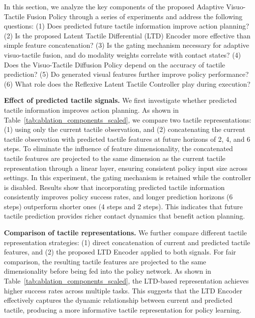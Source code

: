 In this section, we analyze the key components of the proposed Adaptive Visuo-Tactile Fusion Policy through a series of experiments and address the following questions:
(1) Does predicted future tactile information improve action planning?
(2) Is the proposed Latent Tactile Differential (LTD) Encoder more effective than simple feature concatenation?
(3) Is the gating mechanism necessary for adaptive visuo-tactile fusion, and do modality weights correlate with contact states?
(4) Does the Visuo-Tactile Diffusion Policy depend on the accuracy of tactile prediction?
(5) Do generated visual features further improve policy performance?
(6) What role does the Reflexive Latent Tactile Controller play during execution?

\noindent \textbf{Effect of predicted tactile signals.}
We first investigate whether predicted tactile information improves action planning. As shown in Table~\ref{tab:ablation_components_scaled}, we compare two tactile representations:
(1) using only the current tactile observation, and
(2) concatenating the current tactile observation with predicted tactile features at future horizons of 2, 4, and 6 steps.
To eliminate the influence of feature dimensionality, the concatenated tactile features are projected to the same dimension as the current tactile representation through a linear layer, ensuring consistent policy input size across settings. 
In this experiment, the gating mechanism is retained while the controller is disabled.
Results show that incorporating predicted tactile information consistently improves policy success rates, and longer prediction horizons (6 steps) outperform shorter ones (4 steps and 2 steps). This indicates that future tactile prediction provides richer contact dynamics that benefit action planning.




\noindent \textbf{Comparison of tactile representations.}
We further compare different tactile representation strategies:
(1) direct concatenation of current and predicted tactile features, and
(2) the proposed LTD Encoder applied to both signals.
For fair comparison, the resulting tactile features are projected to the same dimensionality before being fed into the policy network.
As shown in Table~\ref{tab:ablation_components_scaled}, the LTD-based representation achieves higher success rates across multiple tasks. This suggests that the LTD Encoder effectively captures the dynamic relationship between current and predicted tactile, producing a more informative tactile representation for policy learning.

